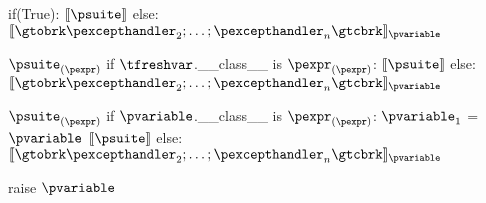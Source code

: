 \documentclass{article}
\begin{document}
\newsavebox{\exnBox}
\begin{lrbox}{\exnBox}
\begin{python}
if(True):
  $\meaningof{\psuite}$
else:
  $\meaningof{\gtobrk \pexcepthandler_2; \ldots; \pexcepthandler_n \gtcbrk}_{\pvariable}$
\end{python}
\end{lrbox}

\begin{mathpar}
\end{mathpar}

\newsavebox{\exnBoxTwo}
\begin{lrbox}{\exnBoxTwo}
\begin{python}
$\psuite_{(\pexpr)}$
if $\tfreshvar$.__class__ is $\pexpr_{(\pexpr)}$:
  $\meaningof{\psuite}$
else:
  $\meaningof{\gtobrk \pexcepthandler_2; \ldots; \pexcepthandler_n \gtcbrk}_{\pvariable}$
\end{python}
\end{lrbox}

\begin{mathpar}
\end{mathpar}

\newsavebox{\exnBoxThree}
\begin{lrbox}{\exnBoxThree}
\begin{python}
$\psuite_{(\pexpr)}$
if $\pvariable$.__class__ is $\pexpr_{(\pexpr)}$:
  $\pvariable_1$ = $\pvariable$
  $\meaningof{\psuite}$
else:
  $\meaningof{\gtobrk \pexcepthandler_2; \ldots; \pexcepthandler_n \gtcbrk}_{\pvariable}$
\end{python}
\end{lrbox}

\begin{mathpar}
\end{mathpar}

\newsavebox{\exnBoxEmpty}
\begin{lrbox}{\exnBoxEmpty}
\begin{python}
raise $\pvariable$
\end{python}
\end{lrbox}
\end{document}
